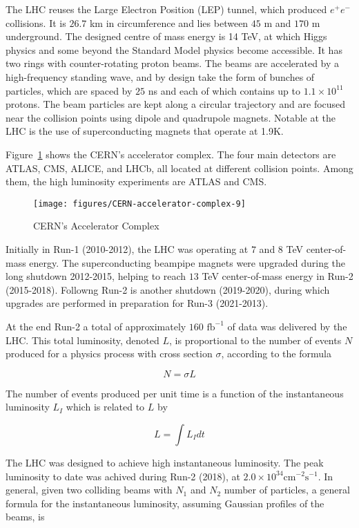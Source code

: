 The LHC reuses the Large Electron Position (LEP) tunnel, which produced
$e^+e^-$ collisions. It is $26.7$ km in circumference and lies between $45$ m
and $170$ m underground. The designed centre of mass energy is 14 TeV, at which
Higgs physics and some beyond the Standard Model physics become accessible. It
has two rings with counter-rotating proton beams. The beams are accelerated by
a high-frequency standing wave, and by design take the form of bunches of
particles, which are spaced by $25$ ns and each of which contains up to
$1.1\times 10^{11}$ protons. The beam particles are kept along a circular
trajectory and are focused near the collision points using dipole and
quadrupole magnets. Notable at the LHC is the use of superconducting magnets
that operate at 1.9K.

Figure~\ref{f:lhcmap} shows the CERN's accelerator complex. The four main
detectors are ATLAS, CMS, ALICE, and LHCb, all located at different collision
points. Among them, the high luminosity experiments are ATLAS and CMS.

\begin{figure}[H]
	\texttt{[image: figures/CERN-accelerator-complex-9]}
	\centering
	\caption{CERN's Accelerator Complex} \cite{acccomplex}
	\label{f:lhcmap}
\end{figure}


Initially in Run-1 (2010-2012), the LHC was operating at $7$ and $8$ TeV
center-of-mass energy. The superconducting beampipe magnets were upgraded
during the long shutdown 2012-2015, helping to reach $13$ TeV center-of-mass
energy in Run-2 (2015-2018). Followng Run-2 is another shutdown (2019-2020),
during which upgrades are performed in preparation for Run-3 (2021-2013).

At the end Run-2 a total of approximately $160\text{ fb}^{-1}$ of data was
delivered by the LHC. This total luminosity, denoted $L$, is proportional to
the number of events $N$ produced for a physics process with cross section
$\sigma$, according to the formula

$$ N = \sigma L$$

The number of events produced per unit time is a function of the instantaneous
luminosity $L_I$ which is related to $L$ by

$$ L = \int L_I dt $$

The LHC was designed to achieve high instantaneous luminosity. The peak
luminosity to date was achived during Run-2 (2018), at $2.0\times 10^{34}\text{
		cm}^{-2}\text{s}^{-1}$. In general, given two colliding beams with $N_1$ and
$N_2$ number of particles, a general formula for the instantaneous luminosity,
assuming Gaussian profiles of the beams, is


